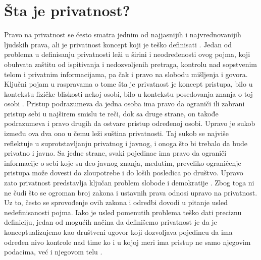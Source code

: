 \documentclass[a4paper]{article}
\begin{document}
\section{Šta je privatnost?}
\label{sec:prvoPoglavlje}
Pravo na privatnost se često smatra jednim od najjasnijih i najvrednovanijih ljudskih prava, ali je privatnost koncept koji je teško definisati \cite{solove}. Jedan od problema u definisanju privatnosti leži u širini i neodređenosti ovog pojma, koji obuhvata zaštitu od ispitivanja i nedozvoljenih pretraga, kontrolu nad sopstvenim telom i privatnim informacijama, pa čak i pravo na slobodu mišljenja i govora. Ključni pojam u raspravama o tome šta je privatnost je koncept pristupa, bilo u kontekstu fizičke bliskosti nekoj osobi, bilo u kontekstu posedovanja znanja o toj osobi \cite{ethics}. Pristup podrazumeva da jedna osoba ima pravo da ograniči ili zabrani pristup sebi u najširem smislu te reči, dok sa druge strane, on takođe podrazumeva i pravo drugih da ostvare pristup određenoj osobi. Upravo je sukob između ova dva ono u čemu leži suština privatnosti. Taj sukob se najviše reflektuje u suprotstavljanju  privatnog i javnog, i onoga što bi trebalo da bude privatno i javno. Sa jedne strane, svaki pojedinac ima pravo da ograniči informacije o sebi koje su deo javnog znanja, međutim, preveliko ograničenje pristupa može dovesti do zloupotrebe i do loših posledica po društvo. Upravo zato privatnost predstavlja ključan problem slobode i demokratije \cite{solove}. Zbog toga ni ne čudi što se ogroman broj zakona i ustavnih prava odnosi upravo na privatnost. Uz to, često se sprovođenje ovih zakona i odredbi dovodi u pitanje usled nedefinisanosti pojma. Iako je usled pomenutih problema teško dati preciznu definiciju, jedan od mogućih načina da definišemo privatnost je da je konceptualizujemo kao društveni ugovor koji dozvoljava pojedincu da ima određen nivo kontrole nad time ko i u kojoj meri ima pristup ne samo njegovim podacima, već i njegovom telu \cite{ethics}.
\end{document}
